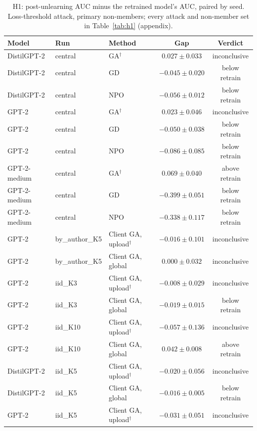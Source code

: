 \begin{table}[t]
\centering
\caption{H1: post-unlearning AUC minus the retrained model's AUC, paired by seed. Loss-threshold attack, primary non-members; every attack and non-member set in Table~\ref{tab:h1} (appendix).}
\label{tab:h1-paper}
\footnotesize
\renewcommand{\arraystretch}{1.2}
\setlength{\tabcolsep}{5pt}
\begin{tabular*}{\textwidth}{@{\extracolsep{\fill}}lllcc@{}}
\toprule
\textbf{Model} & \textbf{Run} & \textbf{Method} & \textbf{Gap} & \textbf{Verdict} \\
\midrule
DistilGPT-2 & central & GA$^{\dagger}$ & $0.027 \pm 0.033$ & inconclusive \\
DistilGPT-2 & central & GD & $-0.045 \pm 0.020$ & below retrain \\
DistilGPT-2 & central & NPO & $-0.056 \pm 0.012$ & below retrain \\
GPT-2 & central & GA$^{\dagger}$ & $0.023 \pm 0.046$ & inconclusive \\
GPT-2 & central & GD & $-0.050 \pm 0.038$ & below retrain \\
GPT-2 & central & NPO & $-0.086 \pm 0.085$ & below retrain \\
GPT-2-medium & central & GA$^{\dagger}$ & $0.069 \pm 0.040$ & above retrain \\
GPT-2-medium & central & GD & $-0.399 \pm 0.051$ & below retrain \\
GPT-2-medium & central & NPO & $-0.338 \pm 0.117$ & below retrain \\
GPT-2 & by\_author\_K5 & Client GA, upload$^{\dagger}$ & $-0.016 \pm 0.101$ & inconclusive \\
GPT-2 & by\_author\_K5 & Client GA, global & $0.000 \pm 0.032$ & inconclusive \\
GPT-2 & iid\_K3 & Client GA, upload$^{\dagger}$ & $-0.008 \pm 0.029$ & inconclusive \\
GPT-2 & iid\_K3 & Client GA, global & $-0.019 \pm 0.015$ & below retrain \\
GPT-2 & iid\_K10 & Client GA, upload$^{\dagger}$ & $-0.057 \pm 0.136$ & inconclusive \\
GPT-2 & iid\_K10 & Client GA, global & $0.042 \pm 0.008$ & above retrain \\
DistilGPT-2 & iid\_K5 & Client GA, upload$^{\dagger}$ & $-0.020 \pm 0.056$ & inconclusive \\
DistilGPT-2 & iid\_K5 & Client GA, global & $-0.016 \pm 0.005$ & below retrain \\
GPT-2 & iid\_K5 & Client GA, upload$^{\dagger}$ & $-0.031 \pm 0.051$ & inconclusive \\

\end{tabular*}
\end{table}
